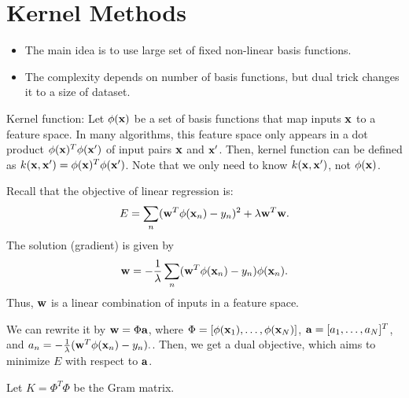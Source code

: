 \chapter{Kernel Methods}
\begin{itemize}
	\item The main idea is to use large set of fixed non-linear basis functions.
	\item The complexity depends on number of basis functions, but dual trick changes it to a size of dataset. 
\end{itemize}

Kernel function: Let $\phi({\mathbf{x}})$ be a set of basis functions that map inputs ${\mathbf{x}}$ to a feature space. In many algorithms, this feature space only appears in a dot product $\phi({\mathbf{x}})^T\phi({\mathbf{x}}')$ of input pairs ${\mathbf{x}}$ and ${\mathbf{x}}'$. Then, kernel function can be defined as $k({\mathbf{x}}, {\mathbf{x}}') = \phi({\mathbf{x}})^T\phi({\mathbf{x}}')$. Note that we only need to know $k({\mathbf{x}}, {\mathbf{x}}')$, not $\phi({\mathbf{x}})$.

Recall that the objective of linear regression is:
$$E =\sum_n ({\mathbf{w}}^T\phi({\mathbf{x}}_n)-y_n)^2 + \lambda {\mathbf{w}}^T{\mathbf{w}}.$$
The solution (gradient) is given by
$${\mathbf{w}} =-\frac{1}{\lambda}\sum_n ({\mathbf{w}}^T\phi({\mathbf{x}}_n)-y_n)\phi({\mathbf{x}}_n).$$
Thus, ${\mathbf{w}}$ is a linear combination of inputs in a feature space. 

We can rewrite it by ${\mathbf{w}} = \Phi {\mathbf{a}}$, where $\Phi = [\phi({\mathbf{x}}_1),\dots,\phi({\mathbf{x}}_N)]$, ${\mathbf{a}} = [a_1,\dots,a_N]^T$, and $a_n =-\frac{1}{\lambda} ({\mathbf{w}}^T\phi({\mathbf{x}}_n)-y_n).$. Then, we get a dual objective, which aims to minimize $E$ with respect to ${\mathbf{a}}$.

Let $K = \Phi^T\Phi$ be the Gram matrix. 

